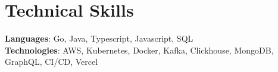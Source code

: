 \section{Technical Skills}
 \begin{itemize}[leftmargin=0.15in, label={}]
    \small{\item{
     \textbf{Languages}{: Go, Java, Typescript, Javascript, SQL} \\
     \vspace{4pt}
     \textbf{Technologies}{: AWS, Kubernetes, Docker, Kafka, Clickhouse, MongoDB, GraphQL, CI/CD, Vercel} \\
    }}
 \end{itemize}
 \vspace{-16pt}
